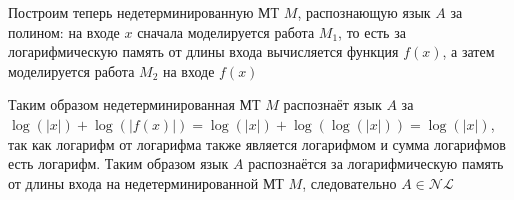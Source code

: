 \documentclass[a4paper,12pt]{article}
\begin{document}
\begin{solution}
\begin{enumerate}
		Построим теперь недетерминированную МТ $M$, распознающую язык $A$ за полином: на входе $x$ сначала моделируется работа $M_1$, то есть за логарифмическую память от длины входа вычисляется функция $f(x)$, а затем моделируется работа $M_2$ на входе $f(x)$
		
		Таким образом недетерминированная МТ $M$ распознаёт язык $A$ за $\log(|x|) + \log(|f(x)|) = \log(|x|) + \log(\log(|x|)) = \log(|x|)$, так как логарифм от логарифма также является логарифмом и сумма логарифмов есть логарифм. Таким образом язык $A$ распознаётся за логарифмическую память от длины входа на недетерминированной МТ $M$, следовательно $A \in \mathcal{NL}$
	\end{enumerate}
\end{solution}
\end{document}
